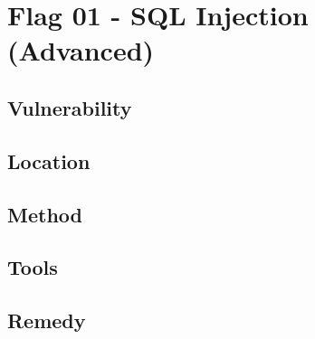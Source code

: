 \section{Flag 01 - SQL Injection (Advanced)}

\subsection{Vulnerability}

\subsection{Location}

\subsection{Method}

\subsection{Tools}

\subsection{Remedy}
